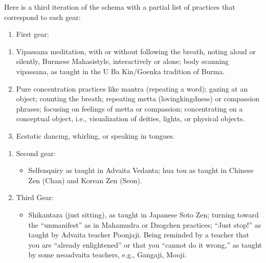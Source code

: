 \documentclass[a5paper,10pt,english]{book}
\begin{document}
\sphinxAtStartPar
Here is a third iteration of the schema with a partial list of practices
that correspond to each gear:
\begin{enumerate}
%
\item {} 
\sphinxAtStartPar
First gear:

\end{enumerate}
\begin{enumerate}
%
\item {} 
\sphinxAtStartPar
Vipassana meditation, with or without following the breath, noting
aloud or silently, Burmese Mahasi\sphinxhyphen{}style, interactively or alone; body
scanning vipassana, as taught in the U Ba Kin/Goenka tradition of
Burma.

\item {} 
\sphinxAtStartPar
Pure concentration practices like mantra (repeating a word); gazing
at an object; counting the breath; repeating metta (lovingkingdness)
or compassion phrases; focusing on feelings of metta or compassion;
concentrating on a conceptual object, i.e., visualization of deities,
lights, or physical objects.

\item {} 
\sphinxAtStartPar
Ecstatic dancing, whirling, or speaking in tongues.

\end{enumerate}
\begin{enumerate}
%
\setcounter{enumi}{1}
\item {} 
\sphinxAtStartPar
Second gear:
\begin{itemize}
\item {} 
\sphinxAtStartPar
Self\sphinxhyphen{}enquiry as taught in Advaita Vedanta; hua tou as taught in
Chinese Zen (Chan) and Korean Zen (Seon).

\end{itemize}

\item {} 
\sphinxAtStartPar
Third Gear:
\begin{itemize}
\item {} 
\sphinxAtStartPar
Shikantaza (just sitting), as taught in Japanese Soto Zen; turning
toward the “un\sphinxhyphen{}manifest” as in Mahamudra or Dzogchen practices; “Just
stop!” as taught by Advaita teacher Poonja\sphinxhyphen{}ji. Being reminded by a
teacher that you are “already enlightened” or that you “cannot do it
wrong,” as taught by some neo\sphinxhyphen{}advaita teachers, e.g., Ganga\sphinxhyphen{}ji,
Mooji.

\end{itemize}

\end{enumerate}
\end{document}
